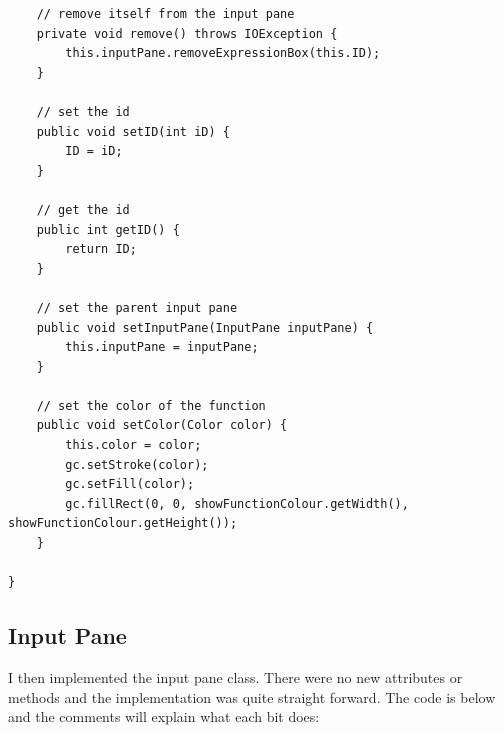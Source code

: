 \documentclass[../../../../main.tex]{subfiles}
\begin{document}
\begin{verbatim}
	// remove itself from the input pane
	private void remove() throws IOException {
		this.inputPane.removeExpressionBox(this.ID);
	}

	// set the id
	public void setID(int iD) {
		ID = iD;
	}

	// get the id
	public int getID() {
		return ID;
	}

	// set the parent input pane
	public void setInputPane(InputPane inputPane) {
		this.inputPane = inputPane;
	}

	// set the color of the function
	public void setColor(Color color) {
		this.color = color;
		gc.setStroke(color);
		gc.setFill(color);
		gc.fillRect(0, 0, showFunctionColour.getWidth(), showFunctionColour.getHeight());
	}

}
\end{verbatim}
\newpage
\subsection{Input Pane}
I then implemented the input pane class. There were no new attributes or methods and the implementation was quite straight forward. The code is below and the comments will explain what each bit does:
\end{document}

